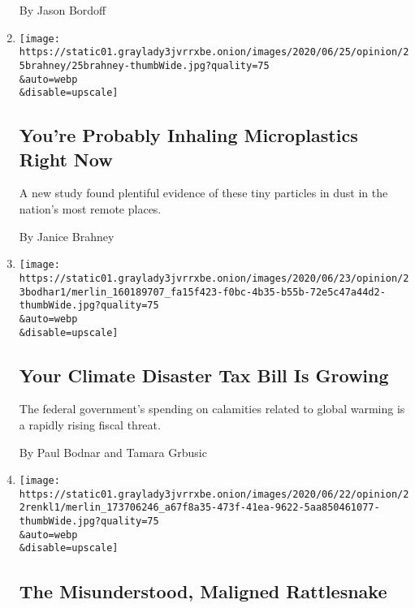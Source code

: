\begin{enumerate}
  By Jason Bordoff
\item
  \href{/2020/06/25/opinion/plastic-air-pollution.html}{}

  \texttt{[image: https://static01.graylady3jvrrxbe.onion/images/2020/06/25/opinion/25brahney/25brahney-thumbWide.jpg?quality=75\\\&auto=webp\\\&disable=upscale]}

  \hypertarget{youre-probably-inhaling-microplastics-right-now}{%
  \subsection{You're Probably Inhaling Microplastics Right
  Now}\label{youre-probably-inhaling-microplastics-right-now}}

  A new study found plentiful evidence of these tiny particles in dust
  in the nation's most remote places.

  By Janice Brahney
\item
  \href{/2020/06/23/opinion/climate-change-financial-disaster.html}{}

  \texttt{[image: https://static01.graylady3jvrrxbe.onion/images/2020/06/23/opinion/23bodhar1/merlin\_160189707\_fa15f423-f0bc-4b35-b55b-72e5c47a44d2-thumbWide.jpg?quality=75\\\&auto=webp\\\&disable=upscale]}

  \hypertarget{your-climate-disaster-tax-bill-is-growing}{%
  \subsection{Your Climate Disaster Tax Bill Is
  Growing}\label{your-climate-disaster-tax-bill-is-growing}}

  The federal government's spending on calamities related to global
  warming is a rapidly rising fiscal threat.

  By Paul Bodnar and Tamara Grbusic
\item
  \href{/2020/06/22/opinion/rattlesnakes.html}{}

  \texttt{[image: https://static01.graylady3jvrrxbe.onion/images/2020/06/22/opinion/22renkl1/merlin\_173706246\_a67f8a35-473f-41ea-9622-5aa850461077-thumbWide.jpg?quality=75\\\&auto=webp\\\&disable=upscale]}

  \hypertarget{the-misunderstood-maligned-rattlesnake}{%
  \subsection{The Misunderstood, Maligned
  Rattlesnake}\label{the-misunderstood-maligned-rattlesnake}}


\end{enumerate}
